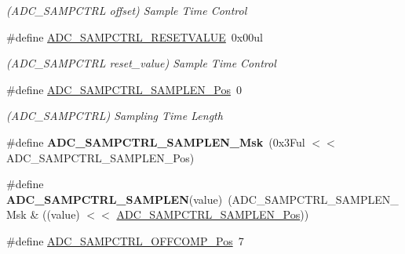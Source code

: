 \begin{DoxyCompactItemize}
\begin{DoxyCompactList}\small\item\em (A\+D\+C\+\_\+\+S\+A\+M\+P\+C\+T\+R\+L offset) Sample Time Control \end{DoxyCompactList}\item 
\hypertarget{group___s_a_m_l21___a_d_c_gaa58117337a5b6c69aef9958ffe3d900a}{}\#define \hyperlink{group___s_a_m_l21___a_d_c_gaa58117337a5b6c69aef9958ffe3d900a}{A\+D\+C\+\_\+\+S\+A\+M\+P\+C\+T\+R\+L\+\_\+\+R\+E\+S\+E\+T\+V\+A\+L\+U\+E}~0x00ul\label{group___s_a_m_l21___a_d_c_gaa58117337a5b6c69aef9958ffe3d900a}

\begin{DoxyCompactList}\small\item\em (A\+D\+C\+\_\+\+S\+A\+M\+P\+C\+T\+R\+L reset\+\_\+value) Sample Time Control \end{DoxyCompactList}\item 
\hypertarget{group___s_a_m_l21___a_d_c_gabcdb0d22f5636adbd1f1ef93dbdb3861}{}\#define \hyperlink{group___s_a_m_l21___a_d_c_gabcdb0d22f5636adbd1f1ef93dbdb3861}{A\+D\+C\+\_\+\+S\+A\+M\+P\+C\+T\+R\+L\+\_\+\+S\+A\+M\+P\+L\+E\+N\+\_\+\+Pos}~0\label{group___s_a_m_l21___a_d_c_gabcdb0d22f5636adbd1f1ef93dbdb3861}

\begin{DoxyCompactList}\small\item\em (A\+D\+C\+\_\+\+S\+A\+M\+P\+C\+T\+R\+L) Sampling Time Length \end{DoxyCompactList}\item 
\hypertarget{group___s_a_m_l21___a_d_c_ga7523cf54abe14bf65a648cc1cad89c92}{}\#define {\bfseries A\+D\+C\+\_\+\+S\+A\+M\+P\+C\+T\+R\+L\+\_\+\+S\+A\+M\+P\+L\+E\+N\+\_\+\+Msk}~(0x3\+Ful $<$$<$ A\+D\+C\+\_\+\+S\+A\+M\+P\+C\+T\+R\+L\+\_\+\+S\+A\+M\+P\+L\+E\+N\+\_\+\+Pos)\label{group___s_a_m_l21___a_d_c_ga7523cf54abe14bf65a648cc1cad89c92}

\item 
\hypertarget{group___s_a_m_l21___a_d_c_gaa68878386ae439e0362631276472b6f1}{}\#define {\bfseries A\+D\+C\+\_\+\+S\+A\+M\+P\+C\+T\+R\+L\+\_\+\+S\+A\+M\+P\+L\+E\+N}(value)~(A\+D\+C\+\_\+\+S\+A\+M\+P\+C\+T\+R\+L\+\_\+\+S\+A\+M\+P\+L\+E\+N\+\_\+\+Msk \& ((value) $<$$<$ \hyperlink{group___s_a_m_l21___a_d_c_gabcdb0d22f5636adbd1f1ef93dbdb3861}{A\+D\+C\+\_\+\+S\+A\+M\+P\+C\+T\+R\+L\+\_\+\+S\+A\+M\+P\+L\+E\+N\+\_\+\+Pos}))\label{group___s_a_m_l21___a_d_c_gaa68878386ae439e0362631276472b6f1}

\item 
\hypertarget{group___s_a_m_l21___a_d_c_ga775b34af95139f2d40e4c4aa6f40a261}{}\#define \hyperlink{group___s_a_m_l21___a_d_c_ga775b34af95139f2d40e4c4aa6f40a261}{A\+D\+C\+\_\+\+S\+A\+M\+P\+C\+T\+R\+L\+\_\+\+O\+F\+F\+C\+O\+M\+P\+\_\+\+Pos}~7\label{group___s_a_m_l21___a_d_c_ga775b34af95139f2d40e4c4aa6f40a261}


\end{DoxyCompactItemize}
